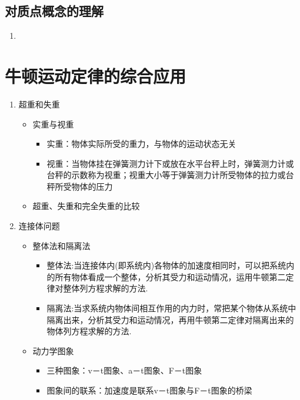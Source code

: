 \documentclass[cn,11pt]{elegantbook}
\begin{document}
\section{对质点概念的理解}
\begin{enumerate}
   \item 
\end{enumerate}


\chapter{牛顿运动定律的综合应用}
\begin{enumerate}
   \item 超重和失重
   \begin{itemize}
      \item 实重与视重
      \begin{itemize}
         \item 实重：物体实际所受的重力，与物体的运动状态无关
         \item 视重：当物体挂在弹簧测力计下或放在水平台秤上时，弹簧测力计或台秤的示数称为视重；视重大小等于弹簧测力计所受物体的拉力或台秤所受物体的压力
      \end{itemize}
      \item 超重、失重和完全失重的比较
      
   \end{itemize}
   \item 连接体问题
   \begin{itemize}
      \item 整体法和隔离法
      \begin{itemize}
         \item 整体法:当连接体内(即系统内)各物体的加速度相同时，可以把系统内的所有物体看成一个整体，分析其受力和运动情况，运用牛顿第二定律对整体列方程求解的方法.
         \item 隔离法:当求系统内物体间相互作用的内力时，常把某个物体从系统中隔离出来，分析其受力和运动情况，再用牛顿第二定律对隔离出来的物体列方程求解的方法.
      \end{itemize}
      \item 动力学图象
      \begin{itemize}
         \item 三种图象：v－t图象、a－t图象、F－t图象
         \item 图象间的联系：加速度是联系v－t图象与F－t图象的桥梁
      \end{itemize}
   \end{itemize}
\end{enumerate}
\end{document}
